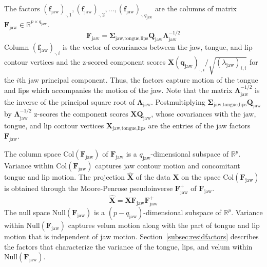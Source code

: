 \documentclass[preprint]{JASAnew}
\begin{document}
% 
The factors $(\mathbf{f}_\text{jaw})_{\cdot,1},(\mathbf{f}_\text{jaw})_{\cdot,2},\ldots,(\mathbf{f}_\text{jaw})_{\cdot,q_\text{jaw}}$ are the columns of matrix $\mathbf{F}_\text{jaw} \in \mathbb{R}^{p\times q_\text{jaw}}$. 
%
\begin{equation}
\mathbf{F}_\text{jaw}
 = \boldsymbol{\Sigma}_\text{jaw,tongue,lips} \mathbf{Q}_\text{jaw} \boldsymbol{\Lambda}_\text{jaw}^{-1/2}
\end{equation}
%
Column $(\mathbf{f}_\text{jaw})_{\cdot,i}$ is the vector of covariances between the jaw, tongue, and lip contour vertices and the z-scored component scores $\mathbf{X} (\mathbf{q}_\text{jaw})_{\cdot,i} / \sqrt{(\lambda_\text{jaw})_{i,i}}$ for the $i$th jaw principal component. 
%
Thus, the factors capture motion of the tongue and lips which accompanies the motion of the jaw. 
%
Note that the matrix $\boldsymbol{\Lambda}_\text{jaw}^{-1/2}$ is the inverse of the principal square root of $\boldsymbol{\Lambda}_\text{jaw}$.
%
Postmultiplying $\boldsymbol{\Sigma}_\text{jaw,tongue,lips} \mathbf{Q}_\text{jaw}$ by $\boldsymbol{\Lambda}_\text{jaw}^{-1/2}$ z-scores the component scores $\mathbf{X}\mathbf{Q}_\text{jaw}$, whose covariances with the jaw, tongue, and lip contour vertices $\mathbf{X}_\text{jaw,tongue,lips}$ are the entries of the jaw factors $\mathbf{F}_\text{jaw}$.

The column space $\mathrm{Col}(\mathbf{F}_\text{jaw})$ of $\mathbf{F}_\text{jaw}$ is a $q_\text{jaw}$-dimensional subspace of $\mathbb{R}^p$. 
%
Variance within $\mathrm{Col}(\mathbf{F}_\text{jaw})$ captures jaw contour motion and concomitant tongue and lip motion. 
%
The projection $\mathbf{\hat{X}}$ of the data $\mathbf{X}$ on the space $\mathrm{Col}(\mathbf{F}_\text{jaw})$ is obtained through the Moore-Penrose pseudoinverse $\mathbf{F}_\text{jaw}^+$ of $\mathbf{F}_\text{jaw}$. 
%
\begin{equation} \label{eq:XXuu}
\mathbf{\hat{X}} 
= \mathbf{X} 
  \mathbf{F}_\text{jaw}
  \mathbf{F}_\text{jaw}^+ 
\end{equation}
%
The null space $\mathrm{Null}(\mathbf{F}_\text{jaw})$ is a $(p-q_\text{jaw})$-dimensional subspace of $\mathbb{R}^p$. 
% 
Variance within $\mathrm{Null}(\mathbf{F}_\text{jaw})$ captures velum motion along with the part of tongue and lip motion that is independent of jaw motion. 
%
Section~\ref{subsec:residfactors} describes the factors that characterize the variance of the tongue, lips, and velum within $\mathrm{Null} \left( \mathbf{F}_\text{jaw} \right)$. 
\end{document}
